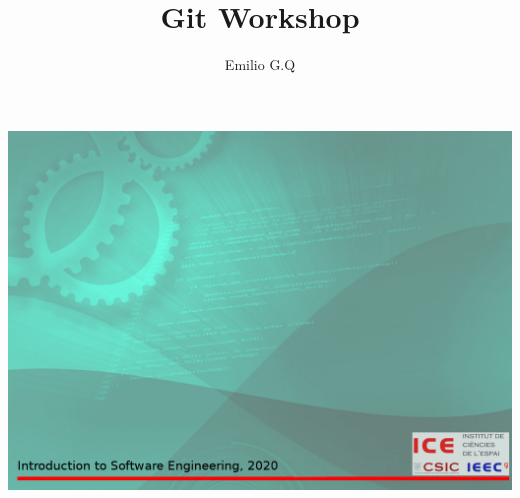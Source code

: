 \graphicspath{ {fig/} }
\title{Git Workshop}
\author{Emilio G.Q}

\usebackgroundtemplate%
{%
    \includegraphics[width=\paperwidth,height=\paperheight]{background.jpg}%
}
